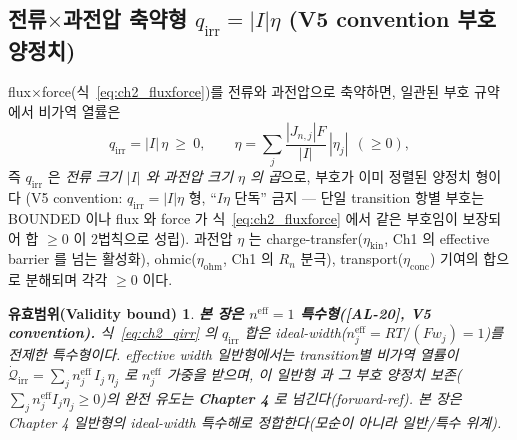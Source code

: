 \documentclass[11pt,a4paper]{article}
\newtheorem*{boundbox}{유효범위(Validity bound)}
\newcommand{\eff}{\mathrm{eff}}
\newcommand{\irr}{\mathrm{irr}}
\newcommand{\kin}{\mathrm{kin}}
\newcommand{\ohm}{\mathrm{ohm}}
\newcommand{\conc}{\mathrm{conc}}
\newcommand{\AL}[1]{\textsf{[AL-#1]}}
\begin{document}
\subsection{전류$\times$과전압 축약형 $q_\irr=|I|\eta$ (V5 convention 부호 양정치)}\label{sec:ch2_Ieta}
flux$\times$force(식~\eqref{eq:ch2_fluxforce})를 전류와 과전압으로 축약하면, 일관된 부호 규약에서 비가역 열률은
\begin{equation}
\boxed{\;q_{\irr}=|I|\,\eta\ \ge\ 0,\qquad \eta=\sum_j \frac{|J_{n,j}|F}{|I|}\,|\eta_j|\ \ (\ge0),\;}
\label{eq:ch2_qirr}
\end{equation}
즉 $q_\irr$ 은 \emph{전류 크기 $|I|$ 와 과전압 크기 $\eta$ 의 곱}으로, 부호가 이미 정렬된 양정치 형이다
(V5 convention: $q_\irr=|I|\eta$ 형, ``$I\eta$ 단독'' 금지 — 단일 transition 항별 부호는 BOUNDED 이나
flux 와 force 가 식~\eqref{eq:ch2_fluxforce} 에서 같은 부호임이 보장되어 합 $\ge0$ 이 2법칙으로 성립). 과전압
$\eta$ 는 charge-transfer($\eta_\kin$, Ch1 의 effective barrier 를 넘는 활성화), ohmic($\eta_\ohm$, Ch1 의
$R_n$ 분극), transport($\eta_\conc$) 기여의 합으로 분해되며 각각 $\ge0$ 이다.
\begin{boundbox}
\textbf{본 장은 $n^{\eff}=1$ 특수형(\AL{20}, V5 convention).} 식~\eqref{eq:ch2_qirr} 의 $q_\irr$ 합은
ideal-width($n_j^{\eff}=RT/(Fw_j)=1$)를 전제한 특수형이다. effective width 일반형에서는 transition별 비가역
열률이 $\dot{\mathcal Q}_{\irr}=\sum_j n_j^{\eff}\,I_j\,\eta_j$ 로 $n_j^{\eff}$ 가중을 받으며, 이 \emph{일반형}
과 그 부호 양정치 보존($\sum_j n_j^{\eff}I_j\eta_j\ge0$)의 완전 유도는 \textbf{Chapter 4} 로 넘긴다(forward-ref).
본 장은 Chapter 4 일반형의 ideal-width 특수해로 정합한다(모순이 아니라 일반/특수 위계).
\end{boundbox}
\end{document}
